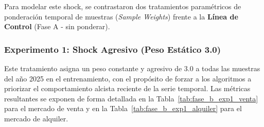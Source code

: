 \documentclass[a4paper,11pt,openany]{book}
\begin{document}
Para modelar este shock, se contrastaron dos tratamientos paramétricos de ponderación temporal de muestras (\textit{Sample Weights}) frente a la \textbf{Línea de Control} (Fase A - sin ponderar).

\subsubsection{Experimento 1: Shock Agresivo (Peso Estático 3.0)}
Este tratamiento asigna un peso constante y agresivo de 3.0 a todas las muestras del año 2025 en el entrenamiento, con el propósito de forzar a los algoritmos a priorizar el comportamiento alcista reciente de la serie temporal. Las métricas resultantes se exponen de forma detallada en la Tabla~\ref{tab:fase_b_exp1_venta} para el mercado de venta y en la Tabla~\ref{tab:fase_b_exp1_alquiler} para el mercado de alquiler.

\begin{table}[H]
\centering
{}
\caption{Métricas obtenidas en el Mercado de Venta para el Experimento 1 (Shock Agresivo con Peso Estático 3.0 en 2025).}
\label{tab:fase_b_exp1_venta}
\end{table}
\end{document}
